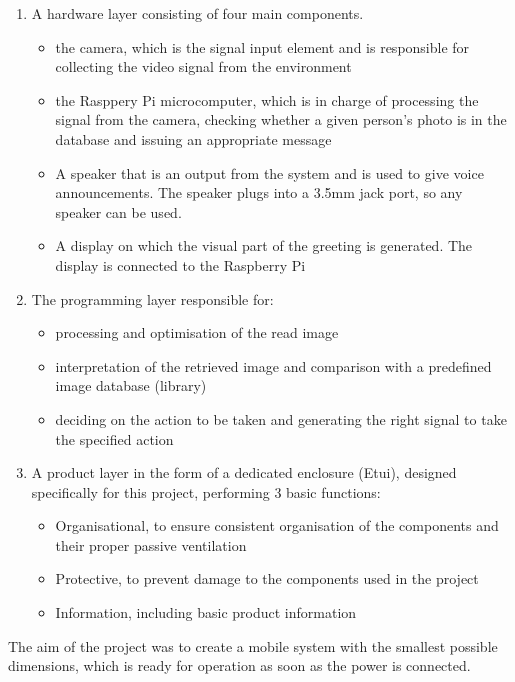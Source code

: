 \documentclass[a4paper,12pt,reqno]{article}
\begin{document}
\begin{enumerate} %
  \item A hardware layer consisting of four main components.
  \begin{itemize}
  	\item the camera, which is the signal input element and is responsible for collecting the video signal from the environment
  	\item the Rasppery Pi microcomputer, which is in charge of processing the signal from the camera, checking whether a given person's photo is in the database and issuing an appropriate message
  	\item A speaker that is an output from the system and is used to give voice announcements. The speaker plugs into a 3.5mm jack port, so any speaker can be used.
  	\item A display on which the visual part of the greeting is generated. The display is connected to the Raspberry Pi
  \end{itemize}
  \item The programming layer responsible for:
  \begin{itemize}
  	\item processing and optimisation of the read image
  	\item interpretation of the retrieved image and comparison with a predefined image database (library)
  	\item deciding on the action to be taken and generating the right signal to take the specified action
  \end{itemize}
  \item A product layer in the form of a dedicated enclosure (Etui), designed specifically for this project, performing 3 basic functions:
  \begin{itemize}
  	\item Organisational, to ensure consistent organisation of the components and their proper passive ventilation
  	\item Protective, to prevent damage to the components used in the project
  	\item Information, including basic product information
  \end{itemize}
\end{enumerate}

The aim of the project was to create a mobile system with the smallest possible dimensions, which is ready for operation as soon as the power is connected.

\newpage
\end{document}
